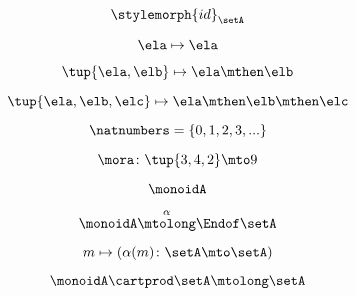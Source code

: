 {\begin{forslides}
        \begin{equation}
            \label{eq:slides_multicategories_44}
            \stylemorph{id}_{\setA}
        \end{equation}

        \begin{equation}
            \label{eq:slides_multicategories_45}
            \ela \mapsto \ela
        \end{equation}

        \begin{equation}
            \label{eq:slides_multicategories_46}
            \tup{\ela, \elb} \mapsto \ela \mthen \elb
        \end{equation}

        \begin{equation}
            \label{eq:slides_multicategories_47}
            \tup{\ela, \elb, \elc} \mapsto \ela \mthen \elb \mthen \elc
        \end{equation}

        \begin{equation}
            \label{eq:slides_multicategories_48}
            \natnumbers = \{0, 1, 2, 3, ... \}
        \end{equation}

        \begin{equation}
            \label{eq:slides_multicategories_49}
            \mora \colon \tup{3,4,2} \mto 9
        \end{equation}

        \begin{equation}
            \label{eq:slides_multicategories_50}
            \monoidA
        \end{equation}

        \begin{equation}
            \label{eq:slides_multicategories_51}
            \monoidA \overset{\alpha}{\mtolong} \Endof \setA
        \end{equation}

        \begin{equation}
            \label{eq:slides_multicategories_52}
            m \mapsto ( \alpha(m) \colon \setA \mto \setA)
        \end{equation}

        \begin{equation}
            \label{eq:slides_multicategories_53}
            \monoidA \cartprod \setA \mtolong \setA
        \end{equation}


\end{forslides}}
